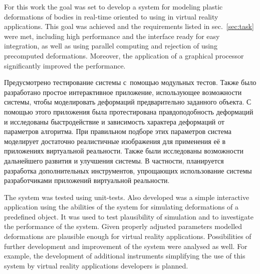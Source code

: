 \documentclass[a4paper, 12pt, titlepage]{extarticle}
\begin{document}

    For this work the goal was set to develop a system for modeling plastic deformations of bodies
    in real-time oriented to using in virtual reality applications. This goal was achieved and the
    requirements listed in sec.~\ref{sec:task} were met, including high performance and the
    interface ready for easy integration, as well as using parallel computing and rejection of using
    precomputed deformations. Moreover, the application of a graphical processor significantly
    improved the performance.

\begin{original}
    Предусмотрено тестирование системы с~помощью модульных тестов. Также было разработано простое интерактивное
    приложение, использующее возможности системы, чтобы моделировать деформаций предварительно
    заданного объекта. С помощью этого приложения была протестирована правдоподобность деформаций и
    исследованы быстродействие и зависимость характера деформаций от параметров алгоритма.
    При правильном подборе этих параметров система моделирует достаточно реалистичные изображения
    для применения её в приложениях виртуальной реальности.
    Также были исследованы возможности дальнейшего развития и улучшения системы. В частности, планируется разработка
    дополнительных инструментов, упрощающих использование системы разработчиками приложений
    виртуальной реальности.
\end{original}

    The system was tested using unit-tests. Also developed was a simple interactive application using
    the abilities of the system for simulating deformations of a predefined object. It was used to
    test plausibility of simulation and to investigate the performance of the system. Given properly
    adjusted parameters modelled deformations are plausible enough for virtual reality applications.
    Possibilities of further development and improvement of the system were analysed as well. For
    example, the development of additional instruments simplifying the use of this system by virtual
    reality applications developers is planned.

  \begin{flushleft}
    
  \end{flushleft}
\end{document}

